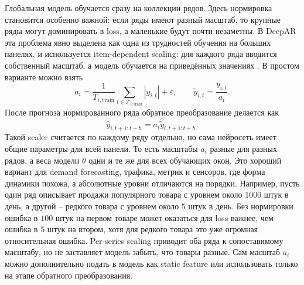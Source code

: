 \documentclass[12pt,fleqn]{article}
\begin{document}
Глобальная модель обучается сразу на коллекции рядов.
Здесь нормировка становится особенно важной: если ряды имеют разный масштаб, то крупные ряды могут доминировать в loss, а маленькие будут почти незаметны.
В DeepAR эта проблема явно выделена как одна из трудностей обучения на больших панелях, и используется item-dependent scaling: для каждого ряда вводится собственный масштаб, а модель обучается на приведённых значениях \cite{salinas2017}.
В простом варианте можно взять
\begin{equation}
  a_i =
  \frac{1}{T_{i,\mathrm{train}}}
  \sum_{t \in \mathcal{T}_{i,\mathrm{train}}}
  |y_{i,t}|
  +
  \varepsilon,
  \qquad
  \widetilde{y}_{i,t} = \frac{y_{i,t}}{a_i}.
\end{equation}
После прогноза нормированного ряда обратное преобразование делается как
\begin{equation}
  \widehat{y}_{i,t+1:t+h}
  =
  a_i \widehat{\widetilde{y}}_{i,t+1:t+h}.
\end{equation}
Такой scaler считается по каждому ряду отдельно, но сама нейросеть имеет общие параметры для всей панели.
То есть масштабы $a_i$ разные для разных рядов, а веса модели $\theta$ одни и те же для всех обучающих окон.
Это хороший вариант для demand forecasting, трафика, метрик и сенсоров, где форма динамики похожа, а абсолютные уровни отличаются на порядки.
Например, пусть один ряд описывает продажи популярного товара с уровнем около $1000$ штук в день, а другой -- редкого товара с уровнем около $5$ штук в день.
Без нормировки ошибка в $100$ штук на первом товаре может оказаться для loss важнее, чем ошибка в $5$ штук на втором, хотя для редкого товара это уже огромная относительная ошибка.
Per-series scaling приводит оба ряда к сопоставимому масштабу, но не заставляет модель забыть, что товары разные.
Сам масштаб $a_i$ можно дополнительно подать в модель как static feature или использовать только на этапе обратного преобразования.
\end{document}
